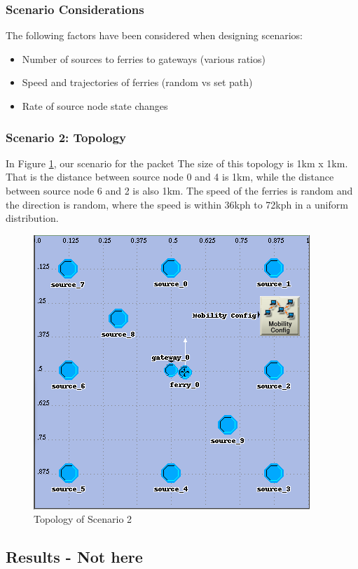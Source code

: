 \subsubsection{Scenario Considerations}

The following factors have been considered when designing scenarios:
\begin{itemize}
\item Number of sources to ferries to gateways (various ratios)
\item Speed and trajectories of ferries (random vs set path)
\item Rate of source node state changes
\end{itemize}

\subsubsection{Scenario 2: Topology}

In Figure \ref{fig:scenario2}, our scenario for the packet The size of this topology is 1km x 1km.  
That is the distance between source node 0 and 4 is 1km, while the distance between source node 6 and 2 is also 1km.  
The speed of the ferries is random and the direction is random, where the speed is within 36kph to 72kph in a uniform distribution.  

\begin{figure}[h]
    \centering
    \includegraphics[width=.5\textwidth]{images/scenario2-top}
    \caption{Topology of Scenario 2}
    \label{fig:scenario2}
\end{figure}


\subsection{Results - Not here}


